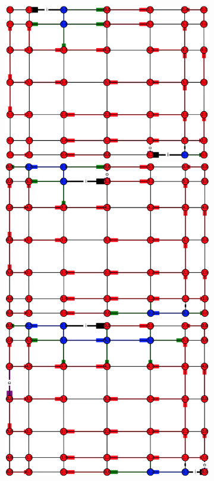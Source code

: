 \documentclass{article}
\begin{document}
\begin{figure}
\centering
\begin{subfigure}{.5\textwidth}
  \vspace{-6.0\baselineskip}
  \includegraphics[width=0.8\linewidth,angle=-90]{figures/g2_primal_1.png}\\[9ex]
  \includegraphics[width=0.8\linewidth,angle=-90]{figures/g2_primal_2.png}\\[9ex]
  \includegraphics[width=0.8\linewidth,angle=-90]{figures/g2_primal_3.png}

\end{subfigure}
\end{figure}
\end{document}
